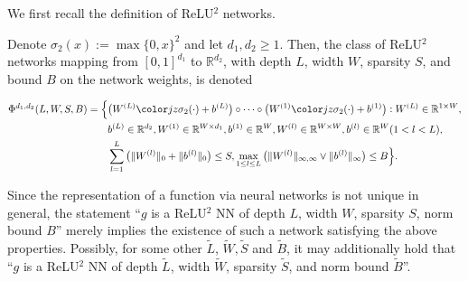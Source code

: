 We first recall the definition of ReLU$^2$ networks.

\begin{definition}\label{def:ReLUm}
  Denote $\sigma_2(x):=\max\{0,x\}^2$ and let
  $d_1,d_2\ge 1$. Then, the class of ReLU$^2$
  networks mapping from $[0,1]^{d_1}$ to $\mathbb{R}^{d_2}$, with
  depth
  $L$, width $W$, sparsity %
  $S$, and %
  bound $B$ on the network weights, is denoted
  
  \begin{align*}
    \Phi^{d_1,d_2}(L, W, S, B) = \Big\{&\big(W^{(L)}\jz{\sigma_2}(\cdot) + b^{(L)}\big)\circ\cdots\circ\big(W^{(1)}\jz{\sigma_2}(\cdot) + b^{(1)}\big): W^{(L)} \in \mathbb{R}^{1\times W},\\
                                 &b^{(L)}\in\mathbb{R}^{d_2}, W^{(1)}\in\mathbb{R}^{W\times d_1},b^{(1)}\in\mathbb{R}^W, W^{(l)}\in\mathbb{R}^{W\times W},b^{(l)}\in\mathbb{R}^W (1<l<L),\\
                                 &\sum_{l=1}^L\big(\|W^{(l)}\|_0 + \|b^{(l)}\|_0\big) \leq S, \max_{1\leq l\leq L} \big(\|W^{(l)}\|_{\infty,\infty}\lor \|b^{(l)}\|_\infty\big)\leq B \Big\}.\\    
  \end{align*}
\end{definition}
\begin{remark}
  Since the representation of a function via neural networks is not
  unique in general, the statement ``$g$ is a ReLU$^2$ NN of depth $L$,
  width $W$, sparsity $S$, norm bound $B$'' merely implies the existence of such a network satisfying the above
  properties. Possibly, for some other $\tilde L$, $\tilde W, \tilde S$
  and $\tilde B$, it may additionally hold that ``$g$ is a ReLU$^2$
  NN of depth $\tilde L$, width $\tilde W$, sparsity $\tilde S$, and norm bound $\tilde B$''.
\end{remark}

